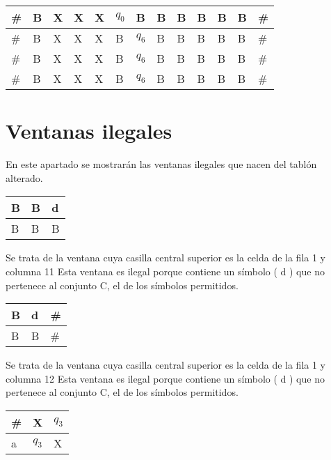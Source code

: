 ﻿\documentclass[a4paper,10pt]{article}
\begin{document}
\begin{table}[h]
\begin{tabular}{|l|l|l|l|l|l|l|l|l|l|l|l|l|}
	\#  &   B   &   X   &   X   &   X   &   $q_0$  &   B   &   B   &   B   &   B   &   B   &   B   &   \#	\\ \hline
	\#  &   B   &   X   &   X   &   X   &   B   &   $q_6$  &   B   &   B   &   B   &   B   &   B   &   \#	\\ \hline
	\#  &   B   &   X   &   X   &   X   &   B   &   $q_6$  &   B   &   B   &   B   &   B   &   B   &   \#	\\ \hline
	\#  &   B   &   X   &   X   &   X   &   B   &   $q_6$  &   B   &   B   &   B   &   B   &   B   &   \#	\\ \hline
\end{tabular}
\end{table}
\section{Ventanas ilegales}
En este apartado se mostrarán las ventanas ilegales que nacen del tablón alterado.\newline\begin{table}[h!]
\centering
\begin{tabular}{|l|l|l|}
\hline
	B   &   B   &   d	\\ \hline
	B   &   B   &   B	\\ \hline
\end{tabular}
\end{table}

Se trata de la ventana cuya casilla central superior es la celda de la fila 1 y columna 11\newline
Esta ventana es ilegal porque contiene un símbolo ( d ) que no pertenece al conjunto C, el de los símbolos permitidos.
\newline
\begin{table}[h!]
\centering
\begin{tabular}{|l|l|l|}
\hline
	B   &   d   &   \#	\\ \hline
	B   &   B   &   \#	\\ \hline
\end{tabular}
\end{table}

Se trata de la ventana cuya casilla central superior es la celda de la fila 1 y columna 12\newline
Esta ventana es ilegal porque contiene un símbolo ( d ) que no pertenece al conjunto C, el de los símbolos permitidos.
\newline
\begin{table}[h!]
\centering
\begin{tabular}{|l|l|l|}
\hline
	\#  &   X   &   $q_3$	\\ \hline
	a   &   $q_3$  &   X	\\ \hline
\end{tabular}
\end{table}
\end{document}
